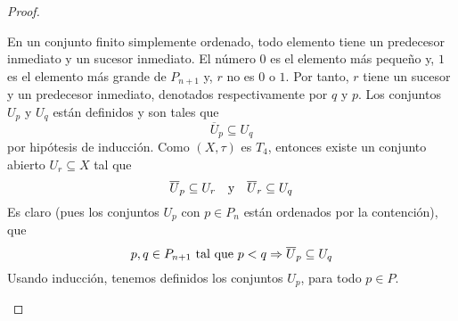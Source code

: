 \documentclass[12pt]{report}
\theoremstyle{largebreak}
\newcommand{\Cls}[1]{\ensuremath{\overline{#1}}}
\begin{document}
\begin{proof}
\begin{enumerate}
            En un conjunto finito simplemente ordenado, todo elemento tiene un predecesor inmediato y un sucesor inmediato. El número $0$ es el elemento más pequeño y, $1$ es el elemento más grande de $P_{n+1}$ y, $r$ no es $0$ o $1$. Por tanto, $r$ tiene un sucesor y un predecesor inmediato, denotados respectivamente por $q$ y $p$. Los conjuntos $U_p$ y $U_q$ están definidos y son tales que
            \begin{equation*}
                \Cls{U}_p\subseteq U_q
            \end{equation*}
            por hipótesis de inducción. Como $(X,\tau)$ es $T_4$, entonces existe un conjunto abierto $U_r\subseteq X$ tal que
            \begin{equation*}
                \Cls{U}_p\subseteq U_r\quad\textup{y}\quad\Cls{U}_r\subseteq U_q
            \end{equation*}
            Es claro (pues los conjuntos $U_p$ con $p\in P_n$ están ordenados por la contención), que
            \begin{equation*}
                p,q\in P_{ n+1}\textup{ tal que }p<q\Rightarrow \Cls{U}_p\subseteq U_q
            \end{equation*}
            Usando inducción, tenemos definidos los conjuntos $U_p$, para todo $p\in P$.


\end{enumerate}
\end{proof}
\end{document}
